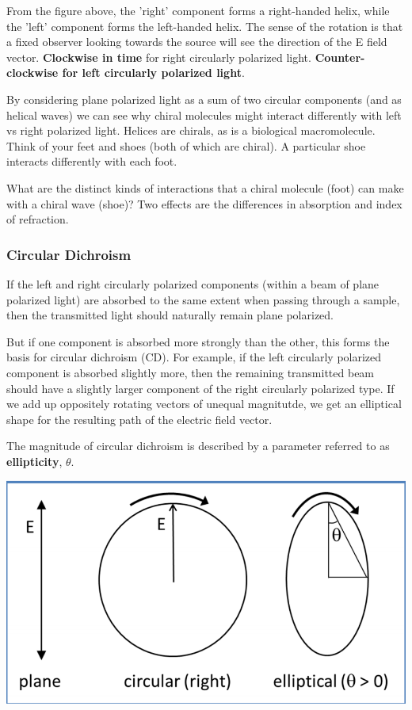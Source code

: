 \documentclass[12pt, letterpaper]{article}
\begin{document}
\newpage

From the figure above, the 'right' component forms a right-handed helix, while the 'left' component forms the left-handed helix. The sense of the rotation is that a fixed observer looking towards the 
source will see the direction of the E field vector. \textbf{Clockwise in time} for right circularly polarized light. \textbf{Counter-clockwise for left circularly polarized light}. 

By considering plane polarized light as a sum of two circular components (and as helical waves) we can see why chiral molecules might interact differently with left vs right polarized light. 
Helices are chirals, as is a biological macromolecule. Think of your feet and shoes (both of which are chiral). A particular shoe interacts differently with each foot. 

What are the distinct kinds of interactions that a chiral molecule (foot) can make with a chiral wave (shoe)? Two effects are the differences in absorption and index of refraction. 

\subsubsection*{Circular Dichroism}

If the left and right circularly polarized components (within a beam of plane polarized light) are absorbed to the same extent when passing through a sample, then 
the transmitted light should naturally remain plane polarized. 

But if one component is absorbed more strongly than the other, this forms the basis for circular dichroism (CD). For example, if the left circularly polarized component is absorbed slightly more, 
then the remaining transmitted beam should have a slightly larger component of the right circularly polarized type. If we add up oppositely rotating vectors of unequal magnitutde, we get an elliptical shape 
for the resulting path of the electric field vector. 

The magnitude of circular dichroism is described by a parameter referred to as \textbf{ellipticity}, $\theta$. 

\begin{center}
    \includegraphics[scale = 0.5]{ellipticity.png}
\end{center}
\end{document}

